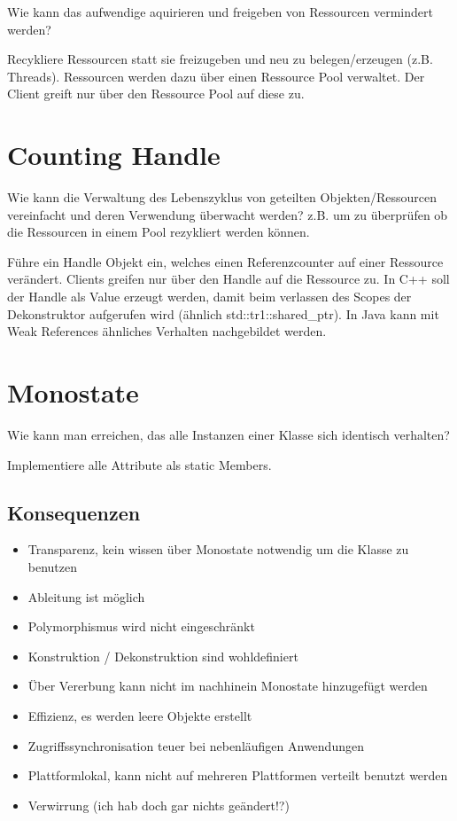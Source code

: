Wie kann das aufwendige aquirieren und freigeben von Ressourcen vermindert werden?

Recykliere Ressourcen statt sie freizugeben und neu zu belegen/erzeugen (z.B. Threads). Ressourcen werden dazu über einen Ressource Pool verwaltet. Der Client greift nur über den Ressource Pool auf diese zu.

\section{Counting Handle}

Wie kann die Verwaltung des Lebenszyklus von geteilten Objekten/Ressourcen vereinfacht und deren Verwendung überwacht werden? z.B. um zu überprüfen ob die Ressourcen in einem Pool rezykliert werden können.

Führe ein Handle Objekt ein, welches einen Referenzcounter auf einer Ressource verändert. Clients greifen nur über den Handle auf die Ressource zu. In C++ soll der Handle als Value erzeugt werden, damit beim verlassen des Scopes der Dekonstruktor aufgerufen wird (ähnlich std::tr1::shared\_ptr). In Java kann mit Weak References ähnliches Verhalten nachgebildet werden.

\section{Monostate}

Wie kann man erreichen, das alle Instanzen einer Klasse sich identisch verhalten?

Implementiere alle Attribute als static Members.

\subsection*{Konsequenzen}

\begin{itemize}
	\item Transparenz, kein wissen über Monostate notwendig um die Klasse zu benutzen
	\item Ableitung ist möglich
	\item Polymorphismus wird nicht eingeschränkt
	\item Konstruktion / Dekonstruktion sind wohldefiniert
	\item Über Vererbung kann nicht im nachhinein Monostate hinzugefügt werden
	\item Effizienz, es werden leere Objekte erstellt
	\item Zugriffssynchronisation teuer bei nebenläufigen Anwendungen
	\item Plattformlokal, kann nicht auf mehreren Plattformen verteilt benutzt werden
	\item Verwirrung (ich hab doch gar nichts geändert!?)
\end{itemize}

